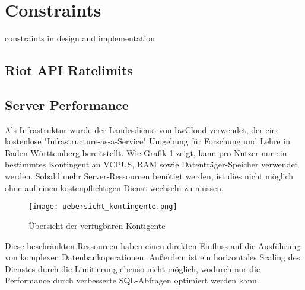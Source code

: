 \section{Constraints}
constraints in design and implementation

\subsection{Riot API Ratelimits}

\subsection{Server Performance}

Als Infrastruktur wurde der Landesdienst von bwCloud verwendet, der eine kostenlose
"Infrastructure-as-a-Service" Umgebung für Forschung und Lehre in Baden-Württemberg bereitstellt.
Wie Grafik \ref{fig:uebersicht_kontingente} zeigt, kann pro Nutzer nur ein bestimmtes Kontingent an VCPUS, RAM sowie Datenträger-Speicher verwendet werden.
Sobald mehr Server-Ressourcen benötigt werden, ist dies nicht möglich ohne auf einen kostenpflichtigen Dienst wechseln zu müssen.

\begin{figure}
\centering
\texttt{[image: uebersicht\_kontingente.png]}
\caption{Übersicht der verfügbaren Kontigente}
\label{fig:uebersicht_kontingente}
\end{figure}

Diese beschränkten Ressourcen haben einen direkten Einfluss auf die Ausführung von komplexen Datenbankoperationen. Außerdem ist ein
horizontales Scaling des Dienstes durch die Limitierung ebenso nicht möglich, wodurch nur die Performance durch verbesserte SQL-Abfragen
optimiert werden kann.
